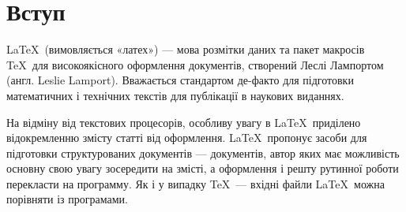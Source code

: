 \section*{Вступ}

\LaTeX~(вимовляється «латех») --- мова розмітки даних та пакет макросів \TeX~для високоякісного оформлення документів, створений Леслі Лампортом (англ. Leslie Lamport). Вважається стандартом де-факто для підготовки математичних і технічних текстів для публікації в наукових виданнях.

На відміну від текстових процесорів, особливу увагу в \LaTeX~приділено відокремленню змісту статті від оформлення. \LaTeX~пропонує засоби для підготовки структурованих документів --- документів, автор яких має можливість основну свою увагу зосередити на змісті, а оформлення і решту рутинної роботи перекласти на программу. Як і у випадку \TeX~--- вхідні файли \LaTeX~можна порівняти із програмами.
